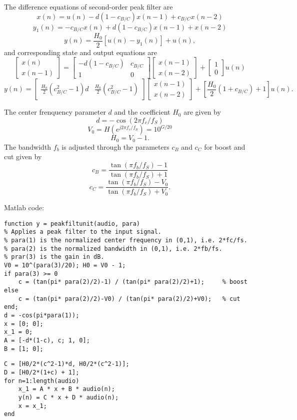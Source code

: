 \documentclass[10pt,a4paper,oneside]{beamer}
\begin{document}
\begin{frame}
The difference equations of second-order peak filter are
\[
x(n) = u(n) - d(1 - c_{B/C})x(n - 1) + c_{B/C}x(n - 2)
\]
\[
y_1(n) = -c_{B/C}x(n) + d(1 - c_{B/C})x(n - 1) + x(n - 2)
\]
\[
y(n) = \frac{H_0}{2}[u(n) - y_1(n)] + u(n),
\]
and corresponding state and output equations are
\[
\begin{bmatrix}x(n)\\x(n-1)\end{bmatrix} = \begin{bmatrix}
-d(1-c_{B/C})&c_{B/C}\\
1&0
\end{bmatrix}
\begin{bmatrix}x(n-1)\\x(n-2)\end{bmatrix} + \begin{bmatrix}1\\0\end{bmatrix}
u(n)\]
\[
y(n) = \begin{bmatrix}\frac{H_0}{2}(c_{B/C}^2-1)d&\frac{H_0}{2}(c_{B/C}^2-1)\end{bmatrix}
\begin{bmatrix}x(n-1)\\x(n-2)\end{bmatrix} + [\frac{H_0}{2}(1+c_{B/C})+1]u(n).
\]
\end{frame}

\begin{frame}
The center frenquency parameter $d$ and the coefficient $H_0$ are given by
\[
d = -\cos(2\pi f_c/f_S)
\]
\[
V_0 = H(e^{j2\pi f_c/f_S}) = 10^{G/20}
\]
\[
H_0 = V_0 - 1.
\]
The bandwidth $f_b$ is adjusted through the parameters $c_B$ and $c_C$ for boost and cut given by
\[
c_B = \frac{\tan(\pi f_b/f_S) - 1}{\tan(\pi f_b/f_S) + 1}
\]
\[
c_C = \frac{\tan(\pi f_b/f_S) - V_0}{\tan(\pi f_b/f_S) + V_0}.
\]
\end{frame}
\begin{frame}[fragile]
Matlab code:
\begin{lstlisting}
function y = peakfiltunit(audio, para)
% Applies a peak filter to the input signal.
% para(1) is the normalized center frequency in (0,1), i.e. 2*fc/fs.
% para(2) is the normalized bandwidth in (0,1), i.e. 2*fb/fs.
% prar(3) is the gain in dB.
V0 = 10^(para(3)/20); H0 = V0 - 1;
if para(3) >= 0
    c = (tan(pi* para(2)/2)-1) / (tan(pi* para(2)/2)+1);     % boost
else
    c = (tan(pi* para(2)/2)-V0) / (tan(pi* para(2)/2)+V0);   % cut
end;
d = -cos(pi*para(1));
x = [0; 0];
x_1 = 0;
A = [-d*(1-c), c; 1, 0];
B = [1; 0];
\end{lstlisting}
\end{frame}
\begin{frame}[fragile]
\begin{lstlisting}
C = [H0/2*(c^2-1)*d, H0/2*(c^2-1)];
D = [H0/2*(1+c) + 1];
for n=1:length(audio)
    x_1 = A * x + B * audio(n);
    y(n) = C * x + D * audio(n);
    x = x_1;
end
\end{lstlisting}
\end{frame}
\end{document}

